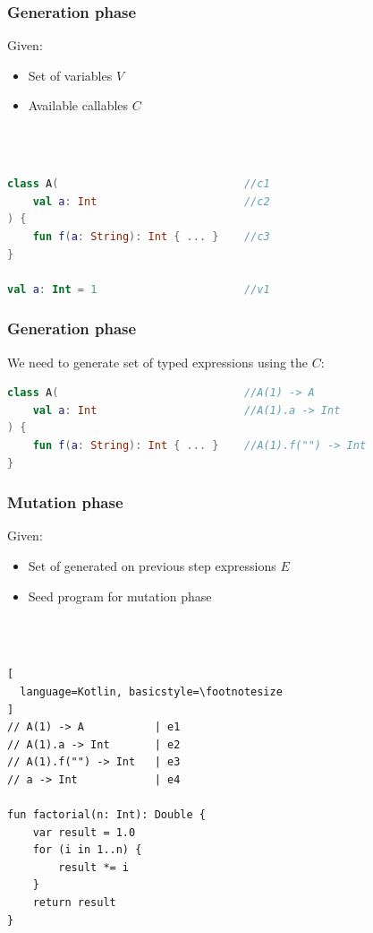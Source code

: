 \begin{frame}[fragile]
	\frametitle{Generation phase}
	Given:
	\begin{itemize}
		\item Set of variables $V$ 
		\item Available callables $C$
	\end{itemize}
	\ \\ \ \\
			\begin{lstlisting}[language=Kotlin,basicstyle=\footnotesize]
class A(                             //c1
    val a: Int                       //c2
) {                
    fun f(a: String): Int { ... }    //c3
}

val a: Int = 1                       //v1

		\end{lstlisting}
\end{frame}


\begin{frame}[fragile]
	\frametitle{Generation phase}
	We need to generate set of typed expressions using the $C$:
\begin{lstlisting}[language=Kotlin,basicstyle=\footnotesize]
class A(                             //A(1) -> A
    val a: Int                       //A(1).a -> Int
) {                
    fun f(a: String): Int { ... }    //A(1).f("") -> Int
}
\end{lstlisting}
\end{frame}






\begin{frame}[fragile]
	\frametitle{Mutation phase}
	Given: 
		\begin{itemize}
			\item Set of generated on previous step expressions $E$
			\item Seed program for mutation phase
		\end{itemize}
	\ \\ \ \\
	\begin{lstlisting}[
  language=Kotlin, basicstyle=\footnotesize
]
// A(1) -> A           | e1
// A(1).a -> Int       | e2
// A(1).f("") -> Int   | e3
// a -> Int            | e4

fun factorial(n: Int): Double {
    var result = 1.0
    for (i in 1..n) {
        result *= i
    }
    return result
}
\end{lstlisting}
\end{frame}

